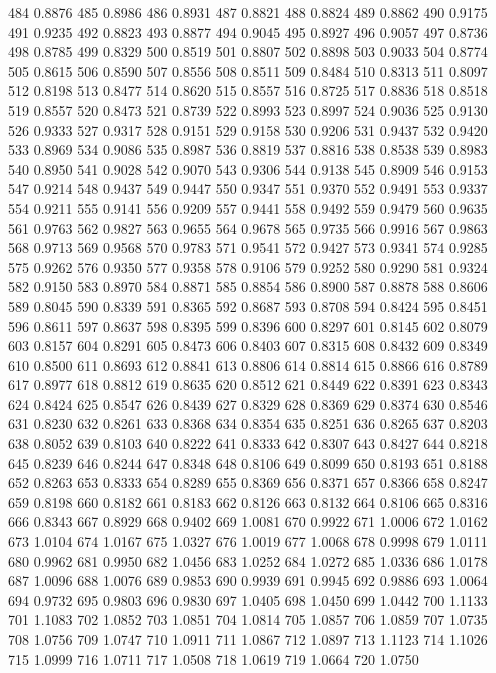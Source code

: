 484 0.8876
485 0.8986
486 0.8931
487 0.8821
488 0.8824
489 0.8862
490 0.9175
491 0.9235
492 0.8823
493 0.8877
494 0.9045
495 0.8927
496 0.9057
497 0.8736
498 0.8785
499 0.8329
500 0.8519
501 0.8807
502 0.8898
503 0.9033
504 0.8774
505 0.8615
506 0.8590
507 0.8556
508 0.8511
509 0.8484
510 0.8313
511 0.8097
512 0.8198
513 0.8477
514 0.8620
515 0.8557
516 0.8725
517 0.8836
518 0.8518
519 0.8557
520 0.8473
521 0.8739
522 0.8993
523 0.8997
524 0.9036
525 0.9130
526 0.9333
527 0.9317
528 0.9151
529 0.9158
530 0.9206
531 0.9437
532 0.9420
533 0.8969
534 0.9086
535 0.8987
536 0.8819
537 0.8816
538 0.8538
539 0.8983
540 0.8950
541 0.9028
542 0.9070
543 0.9306
544 0.9138
545 0.8909
546 0.9153
547 0.9214
548 0.9437
549 0.9447
550 0.9347
551 0.9370
552 0.9491
553 0.9337
554 0.9211
555 0.9141
556 0.9209
557 0.9441
558 0.9492
559 0.9479
560 0.9635
561 0.9763
562 0.9827
563 0.9655
564 0.9678
565 0.9735
566 0.9916
567 0.9863
568 0.9713
569 0.9568
570 0.9783
571 0.9541
572 0.9427
573 0.9341
574 0.9285
575 0.9262
576 0.9350
577 0.9358
578 0.9106
579 0.9252
580 0.9290
581 0.9324
582 0.9150
583 0.8970
584 0.8871
585 0.8854
586 0.8900
587 0.8878
588 0.8606
589 0.8045
590 0.8339
591 0.8365
592 0.8687
593 0.8708
594 0.8424
595 0.8451
596 0.8611
597 0.8637
598 0.8395
599 0.8396
600 0.8297
601 0.8145
602 0.8079
603 0.8157
604 0.8291
605 0.8473
606 0.8403
607 0.8315
608 0.8432
609 0.8349
610 0.8500
611 0.8693
612 0.8841
613 0.8806
614 0.8814
615 0.8866
616 0.8789
617 0.8977
618 0.8812
619 0.8635
620 0.8512
621 0.8449
622 0.8391
623 0.8343
624 0.8424
625 0.8547
626 0.8439
627 0.8329
628 0.8369
629 0.8374
630 0.8546
631 0.8230
632 0.8261
633 0.8368
634 0.8354
635 0.8251
636 0.8265
637 0.8203
638 0.8052
639 0.8103
640 0.8222
641 0.8333
642 0.8307
643 0.8427
644 0.8218
645 0.8239
646 0.8244
647 0.8348
648 0.8106
649 0.8099
650 0.8193
651 0.8188
652 0.8263
653 0.8333
654 0.8289
655 0.8369
656 0.8371
657 0.8366
658 0.8247
659 0.8198
660 0.8182
661 0.8183
662 0.8126
663 0.8132
664 0.8106
665 0.8316
666 0.8343
667 0.8929
668 0.9402
669 1.0081
670 0.9922
671 1.0006
672 1.0162
673 1.0104
674 1.0167
675 1.0327
676 1.0019
677 1.0068
678 0.9998
679 1.0111
680 0.9962
681 0.9950
682 1.0456
683 1.0252
684 1.0272
685 1.0336
686 1.0178
687 1.0096
688 1.0076
689 0.9853
690 0.9939
691 0.9945
692 0.9886
693 1.0064
694 0.9732
695 0.9803
696 0.9830
697 1.0405
698 1.0450
699 1.0442
700 1.1133
701 1.1083
702 1.0852
703 1.0851
704 1.0814
705 1.0857
706 1.0859
707 1.0735
708 1.0756
709 1.0747
710 1.0911
711 1.0867
712 1.0897
713 1.1123
714 1.1026
715 1.0999
716 1.0711
717 1.0508
718 1.0619
719 1.0664
720 1.0750
